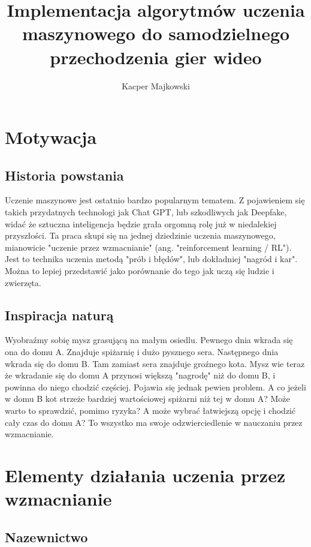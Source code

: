 \documentclass[a4paper,12pt]{article}
\begin{document}
\title{Implementacja algorytmów uczenia maszynowego do samodzielnego przechodzenia gier wideo}
\author{Kacper Majkowski}
\maketitle

\section{Motywacja}

\subsection{Historia powstania}

Uczenie maszynowe jest ostatnio bardzo popularnym tematem. Z pojawieniem się takich przydatnych technologi jak Chat GPT, lub szkodliwych jak Deepfake, widać że sztuczna inteligencja będzie grała orgomną rolę już w niedalekiej przyszłości. Ta praca skupi się na jednej dziedzinie uczenia maszynowego, mianowicie "uczenie przez wzmacnianie" (ang. "reinforcement learning / RL"). Jest to technika uczenia metodą "prób i błędów", lub dokładniej "nagród i kar". Można to lepiej przedstawić jako porównanie do tego jak uczą się ludzie i zwierzęta.

\subsection{Inspiracja naturą}

Wyobraźmy sobię mysz grasującą na małym osiedlu. Pewnego dnia wkrada się ona do domu A. Znajduje spiżarnię i dużo pysznego sera. Następnego dnia wkrada się do domu B. Tam zamiast sera znajduje groźnego kota. Mysz wie teraz że wkradanie się do domu A przynosi większą "nagrodę" niż do domu B, i powinna do niego chodzić częściej. Pojawia się jednak pewien problem. A co jeżeli w domu B kot strzeże bardziej wartościowej spiżarni niż tej w domu A? Może warto to sprawdzić, pomimo ryzyka? A może wybrać łatwiejszą opcję i chodzić cały czas do domu A? To wszystko ma swoje odzwierciedlenie w nauczaniu przez wzmacnianie.

\section{Elementy działania uczenia przez wzmacnianie}

\subsection{Nazewnictwo}
\end{document}
